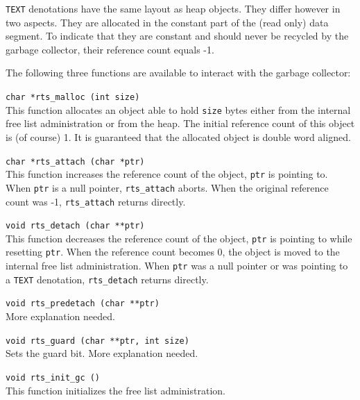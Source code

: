 \documentclass [a4paper,12pt,fleqn]{article}
\begin{document}
{\tt TEXT} denotations have the same layout as heap objects. They differ
however in two aspects. They are allocated in the constant part of the
(read only) data segment. To indicate that they are constant and should
never be recycled by the garbage collector, their reference count equals -1.

The following three functions are available to interact with the garbage
collector:
\begin{list}{-}{}
\item [{\tt char~*rts\_malloc~(int~size)}] ~\\
This function allocates an object able to hold \verb+size+ bytes either
from the internal free list administration or from the heap. The initial
reference count of this object is (of course) 1. It is guaranteed that
the allocated object is double word aligned.
\item [{\tt char~*rts\_attach~(char~*ptr)}] ~\\
This function increases the reference count of the object, {\tt ptr} is
pointing to. When {\tt ptr} is a null pointer, {\tt rts\_attach} aborts.
When the original reference count was -1, {\tt rts\_attach} returns directly.
\item [{\tt void~rts\_detach~(char~**ptr)}] ~\\
This function decreases the reference count of the object, {\tt *ptr} is
pointing to while resetting {\tt *ptr}. When the reference count becomes 0,
the object is moved to the internal free list administration. When {\tt *ptr}
was a null pointer or was pointing to a {\tt TEXT} denotation,
{\tt rts\_detach} returns directly. 
\item [{\tt void~rts\_predetach~(char~**ptr)}] ~\\
More explanation needed.
\item [{\tt void~rts\_guard~(char~**ptr, int size)}] ~\\
Sets the guard bit. More explanation needed.
\item [{\tt void~rts\_init\_gc~()}] ~\\
This function initializes the free list administration.
\end{list}
\end{document}
